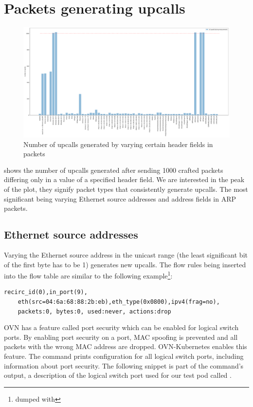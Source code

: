\section{Packets generating upcalls}
\label{res:upcall-generators}

\begin{figure}
    \centering
    \includegraphics[width=.9\linewidth]{img/packet_fuzz.pdf}
    \caption{Number of upcalls generated by varying certain header fields in packets}
    \label{fig:plot-packet-fuzz}
\end{figure}

 shows the number of upcalls generated after sending 1000 crafted packets differing only in a value of a specified header field. We are interested in the peak of the plot, they signify packet types that consistently generate upcalls. The most significant being varying Ethernet source addresses and address fields in ARP packets.

\subsection{Ethernet source addresses}
\label{subsec:ethernet}

Varying the Ethernet source address in the unicast range (the least significant bit of the first byte has to be 1) generates new upcalls. The flow rules being inserted into the flow table are similar to the following example\footnote{dumped with }:

\begin{verbatim}
recirc_id(0),in_port(9),
    eth(src=04:6a:68:88:2b:eb),eth_type(0x0800),ipv4(frag=no),
    packets:0, bytes:0, used:never, actions:drop
\end{verbatim}

OVN has a feature called port security which can be enabled for logical switch ports. By enabling port security on a port, MAC spoofing is prevented and all packets with the wrong MAC address are dropped. OVN-Kubernetes enables this feature. The command  prints configuration for all logical switch ports, including information about port security. The following snippet is part of the command's output, a description of the logical switch port used for our test pod called .

